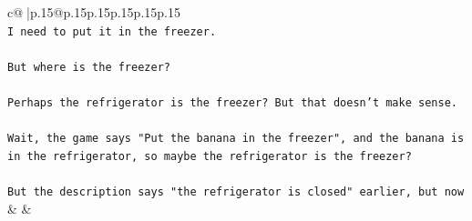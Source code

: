 \documentclass{article}
\begin{document}
{\begin{supertabular}{c@{$\;$}|p{.15\linewidth}@{}p{.15\linewidth}p{.15\linewidth}p{.15\linewidth}p{.15\linewidth}p{.15\linewidth}}
{{{\\ 
\texttt{I need to put it in the freezer.} \\
\\ 
\texttt{But where is the freezer?} \\
\\ 
\texttt{Perhaps the refrigerator is the freezer? But that doesn't make sense.} \\
\\ 
\texttt{Wait, the game says "Put the banana in the freezer", and the banana is in the refrigerator, so maybe the refrigerator is the freezer?} \\
\\ 
\texttt{But the description says "the refrigerator is closed" earlier, but now} \\
            }
        }
    }
    & & \\ \\


\end{supertabular}}
\end{document}
